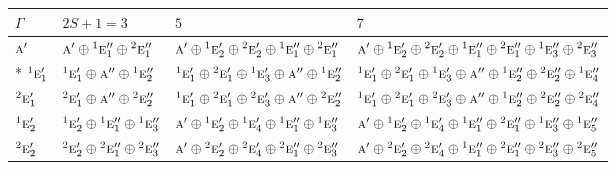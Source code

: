 \documentclass[10pt,a4paper]{article}
\numberwithin{equation}{section}
\newcommand{\irr}[1]{\text{\normalfont\scshape #1}}
\newcommand{\conjpair}[1]{{}^{#1}}
\begin{document}
{\small\setlength{\tabcolsep}{3pt}\begin{longtable}{@{}l>{\RaggedRight\arraybackslash}p{}>{\RaggedRight\arraybackslash}p{}>{\RaggedRight\arraybackslash}p{}@{}}\toprule
$\Gamma$ & $2S + 1 = 3$ & $5$ & $7$\\\midrule\endhead
\bottomrule\endfoot\endlastfoot
$\irr{a}'$ & $\irr{a}'\oplus \conjpair{1}\irr{e}_{1}''\oplus \conjpair{2}\irr{e}_{1}''$ & $\irr{a}'\oplus \conjpair{1}\irr{e}_{2}'\oplus \conjpair{2}\irr{e}_{2}'\oplus \conjpair{1}\irr{e}_{1}''\oplus \conjpair{2}\irr{e}_{1}''$ & $\irr{a}'\oplus \conjpair{1}\irr{e}_{2}'\oplus \conjpair{2}\irr{e}_{2}'\oplus \conjpair{1}\irr{e}_{1}''\oplus \conjpair{2}\irr{e}_{1}''\oplus \conjpair{1}\irr{e}_{3}''\oplus \conjpair{2}\irr{e}_{3}''$\\*
$\conjpair{1}\irr{e}_{1}'$ & $\conjpair{1}\irr{e}_{1}'\oplus \irr{a}''\oplus \conjpair{1}\irr{e}_{2}''$ & $\conjpair{1}\irr{e}_{1}'\oplus \conjpair{2}\irr{e}_{1}'\oplus \conjpair{1}\irr{e}_{3}'\oplus \irr{a}''\oplus \conjpair{1}\irr{e}_{2}''$ & $\conjpair{1}\irr{e}_{1}'\oplus \conjpair{2}\irr{e}_{1}'\oplus \conjpair{1}\irr{e}_{3}'\oplus \irr{a}''\oplus \conjpair{1}\irr{e}_{2}''\oplus \conjpair{2}\irr{e}_{2}''\oplus \conjpair{1}\irr{e}_{4}''$\\
$\conjpair{2}\irr{e}_{1}'$ & $\conjpair{2}\irr{e}_{1}'\oplus \irr{a}''\oplus \conjpair{2}\irr{e}_{2}''$ & $\conjpair{1}\irr{e}_{1}'\oplus \conjpair{2}\irr{e}_{1}'\oplus \conjpair{2}\irr{e}_{3}'\oplus \irr{a}''\oplus \conjpair{2}\irr{e}_{2}''$ & $\conjpair{1}\irr{e}_{1}'\oplus \conjpair{2}\irr{e}_{1}'\oplus \conjpair{2}\irr{e}_{3}'\oplus \irr{a}''\oplus \conjpair{1}\irr{e}_{2}''\oplus \conjpair{2}\irr{e}_{2}''\oplus \conjpair{2}\irr{e}_{4}''$\\
$\conjpair{1}\irr{e}_{2}'$ & $\conjpair{1}\irr{e}_{2}'\oplus \conjpair{1}\irr{e}_{1}''\oplus \conjpair{1}\irr{e}_{3}''$ & $\irr{a}'\oplus \conjpair{1}\irr{e}_{2}'\oplus \conjpair{1}\irr{e}_{4}'\oplus \conjpair{1}\irr{e}_{1}''\oplus \conjpair{1}\irr{e}_{3}''$ & $\irr{a}'\oplus \conjpair{1}\irr{e}_{2}'\oplus \conjpair{1}\irr{e}_{4}'\oplus \conjpair{1}\irr{e}_{1}''\oplus \conjpair{2}\irr{e}_{1}''\oplus \conjpair{1}\irr{e}_{3}''\oplus \conjpair{1}\irr{e}_{5}''$\\
$\conjpair{2}\irr{e}_{2}'$ & $\conjpair{2}\irr{e}_{2}'\oplus \conjpair{2}\irr{e}_{1}''\oplus \conjpair{2}\irr{e}_{3}''$ & $\irr{a}'\oplus \conjpair{2}\irr{e}_{2}'\oplus \conjpair{2}\irr{e}_{4}'\oplus \conjpair{2}\irr{e}_{1}''\oplus \conjpair{2}\irr{e}_{3}''$ & $\irr{a}'\oplus \conjpair{2}\irr{e}_{2}'\oplus \conjpair{2}\irr{e}_{4}'\oplus \conjpair{1}\irr{e}_{1}''\oplus \conjpair{2}\irr{e}_{1}''\oplus \conjpair{2}\irr{e}_{3}''\oplus \conjpair{2}\irr{e}_{5}''$\\

\end{longtable}}
\end{document}
